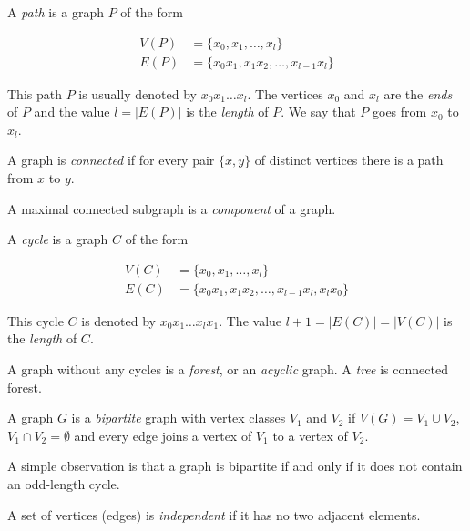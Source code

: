 \begin{defn}[path]
    A \emph{path} is a graph $P$ of the form

    \begin{align*}
        V(P) &= \{x_0, x_1, \dots, x_l\} \\
        E(P) &= \{x_0x_1, x_1x_2, \dots, x_{l-1}x_l\}
    \end{align*}
\end{defn}

This path $P$ is usually denoted by $x_0x_1\dots x_l$. The vertices $x_0$ and $x_l$ are the \emph{ends} of $P$ and the value $l = |E(P)|$ is the \emph{length} of $P$. We say that $P$ goes from $x_0$ to $x_l$.

\begin{defn}
    A graph is \emph{connected} if for every pair $\{x, y\}$ of distinct vertices there is a path from $x$ to $y$.
\end{defn}

A maximal connected subgraph is a \emph{component} of a graph.

\begin{defn}[cycle]
    A \emph{cycle} is a graph $C$ of the form

    \begin{align*}
        V(C) &= \{x_0, x_1, \dots, x_l\} \\
        E(C) &= \{x_0x_1, x_1x_2, \dots, x_{l-1}x_l, x_l x_0\}
    \end{align*}
\end{defn}

This cycle $C$ is denoted by $x_0 x_1\dots x_l x_1$. The value $l + 1 = |E(C)| = |V(C)|$ is the \emph{length} of $C$. 

\begin{defn}
    A graph without any cycles is a \emph{forest}, or an \emph{acyclic} graph. A \emph{tree} is connected forest.
\end{defn}

\begin{defn}
    A graph $G$ is a \emph{bipartite} graph with vertex classes $V_1$ and $V_2$ if $V(G) = V_1 \cup V_2$, $V_1 \cap V_2 = \emptyset$ and every edge joins a vertex of $V_1$ to a vertex of $V_2$.
\end{defn}

A simple observation is that a graph is bipartite if and only if it does not contain an odd-length cycle.

A set of vertices (edges) is \emph{independent} if it has no two adjacent elements.


